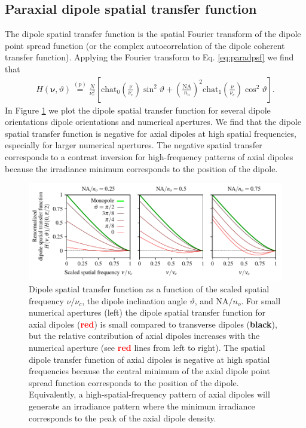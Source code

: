 \documentclass[]{osa-article}
\providecommand{\bs}[1]{\boldsymbol{#1}}
\begin{document}
\subsection{Paraxial dipole spatial transfer function}\label{sec:trans}
The dipole spatial transfer function is the spatial Fourier transform of
the dipole point spread function (or the complex autocorrelation of the dipole
coherent transfer function). Applying the Fourier transform to Eq.
\ref{eq:paradpsf} we find that
  \begin{align}
    H(\bs{\nu}, \vartheta) \stackrel{(p)}{=} \frac{N}{\nu_c^2}\left[\text{chat}_0\left(\frac{\nu}{\nu_c}\right)\sin^2\vartheta + \left(\frac{\text{NA}}{n_o}\right)^2 \text{chat}_1\left(\frac{\nu}{\nu_c}\right)\cos^2\vartheta\right].
  \end{align}
  In Figure \ref{fig:odotf} we plot the dipole spatial transfer function for
  several dipole orientations dipole orientations and numerical apertures. We
  find that the dipole spatial transfer function is negative for axial dipoles
  at high spatial frequencies, especially for larger numerical apertures. The
  negative spatial transfer corresponds to a contrast inversion for
  high-frequency patterns of axial dipoles because the irradiance minimum
  corresponds to the position of the dipole.

\begin{figure}[h]
 \centering
   \centering
   \includegraphics[scale=0.8]{../figures/paratfs/sdtf.pdf}
   \caption{Dipole spatial transfer function as a function of the scaled spatial
     frequency $\nu/\nu_c$, the dipole inclination angle $\vartheta$, and
     $\text{NA}/n_o$. For small numerical apertures (left) the dipole spatial
     transfer function for axial dipoles (\textcolor{red}{\textbf{red}}) is
     small compared to transverse dipoles (\textbf{black}), but the relative
     contribution of axial dipoles increases with the numerical aperture (see
     \textcolor{red}{\textbf{red}} lines from left to right). The spatial dipole
     transfer function of axial dipoles is negative at high spatial frequencies
     because the central minimum of the axial dipole point spread function
     corresponds to the position of the dipole. Equivalently, a
     high-spatial-frequency pattern of axial dipoles will generate an irradiance
     pattern where the minimum irradiance corresponds to the peak of the axial
     dipole density.}
   \label{fig:odotf}
 \end{figure}
\end{document}

